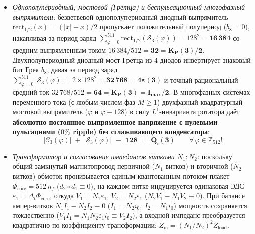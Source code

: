 \begin{enumerate}[label=\textbf{\arabic*.},noitemsep]
\begin{itemize}[noitemsep]
    \[
      \sum_{\varphi=0}^{511} \mathcal{C}_3(\varphi)\,\mathcal{S}_3(\varphi) \;\equiv\; \mathbf{0},
    \]
    а в последовательном $LC$-контуре на резонансной частоте напряжения на индуктивности ($\varphi + 128$) и на ёмкости ($\varphi - 128 \equiv \varphi + 384$) отстоят друг от друга на полупериод противофазы $256$ тиков и взаимно уничтожаются в каждой из $512$ точек кольца: $\mathcal{C}_3(\varphi+128) + \mathcal{C}_3(\varphi+384) \equiv \mathbf{0}$!
  \item \emph{Однополупериодный, мостовой (Гретца) и беспульсационный многофазный выпрямители:} безветвевой однополупериодный диодный выпрямитель $\mathrm{rect}_{1/2}(x) = (|x|+x)/2$ пропускает положительный полупериод ($b_8 = 0$), накапливая за период заряд $\sum_{\varphi=0}^{511}\mathrm{rect}_{1/2}(\mathcal{S}_3(\varphi)) = 128^2 = \mathbf{16\,384}$ со средним выпрямленным током $16\,384 / 512 = \mathbf{32 = K_P(3)/2}$. Двухполупериодный диодный мост Гретца из $4$ диодов инвертирует знаковый бит Грея $b_8$, давая за период заряд $\sum_{\varphi=0}^{511}|\mathcal{S}_3(\varphi)| = 2\times 128^2 = \mathbf{32\,768 = 4\varepsilon(3)}$ и точный рациональный средний ток $32\,768 / 512 = \mathbf{64 = K_P(3) = I_{\max}/2}$. В многофазных системах переменного тока (с любым числом фаз $M\ge 1$) двухфазный квадратурный мостовой выпрямитель ($\varphi$ и $\varphi - 128$) в силу $L^1$-инварианта ротатора даёт \textbf{абсолютно постоянное выпрямленное напряжение с нулевыми пульсациями ($0\%$ ripple) без сглаживающего конденсатора}:
    \[
      |\mathcal{C}_3(\varphi)| \;+\; |\mathcal{S}_3(\varphi)| \;\equiv\; \mathbf{128 \;=\; Q_\square(3)} \qquad \forall\,\varphi\in\mathbb{Z}_{512}!
    \]
  \item \emph{Трансформатор и согласование импедансов витками $N_1 : N_2$:} поскольку общий замкнутый магнитопровод первичной ($N_1$ витков) и вторичной ($N_2$ витков) обмоток пронизывается единым квантованным потоком плакет $\Phi_{\mathrm{core}} = 512\,n_f$ ($d_2\circ d_1 \equiv 0$), на каждом витке индуцируется одинаковая ЭДС $\varepsilon_1 = \Delta_t\Phi_{\mathrm{core}}$, откуда $V_1 = N_1\varepsilon_1$, $V_2 = N_2\varepsilon_1$ ($N_2 V_1 - N_1 V_2 \equiv 0$). При балансе ампер-витков $N_1 I_1 - N_2 I_2 \equiv 0$ ($I_1 = N_2 i_0,\ I_2 = N_1 i_0$) мощность сохраняется тождественно ($V_1 I_1 = N_1 N_2 \varepsilon_1 i_0 \equiv V_2 I_2$), а входной импеданс преобразуется квадратично по коэффициенту трансформации: $Z_{\mathrm{in}} = (N_1 / N_2)^2 Z_{\mathrm{load}}$.
  \end{itemize}
\end{enumerate}

